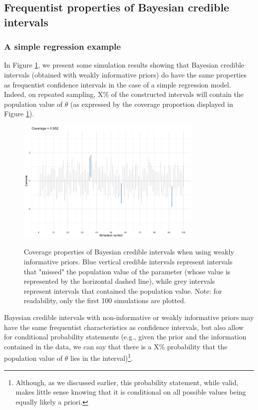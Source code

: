 \documentclass[a4paper,man,natbib,floatsintext,donotrepeattitle]{apa6}
\begin{document}
\subsection{Frequentist properties of Bayesian credible intervals}

\subsubsection{A simple regression example}

In Figure \ref{fig:coverage}, we present some simulation results showing that Bayesian credible intervals (obtained with weakly informative priors) do have the same properties as frequentist confidence intervals in the case of a simple regression model. Indeed, on repeated sampling, X\% of the constructed intervals will contain the population value of $\theta$ (as expressed by the coverage proportion displayed in Figure \ref{fig:coverage}).

\begin{figure}[H]
  \caption{Coverage properties of Bayesian credible intervals when using weakly informative priors. Blue vertical credible intervals represent intervals that "missed" the population value of the parameter (whose value is represented by the horizontal dashed line), while grey intervals represent intervals that contained the population value. Note: for readability, only the first 100 simulations are plotted.}
  \centering
  \includegraphics[width=0.8\textwidth]{coverage1.png}
  \label{fig:coverage}
\end{figure}

Bayesian credible intervals with non-informative or weakly informative priors may have the same frequentist characteristics as confidence intervals, but also allow for conditional probability statements (e.g., given the prior and the information contained in the data, we can say that there is a X\% probability that the population value of $\theta$ lies in the interval)\footnote{Although, as we discussed earlier, this probability statement, while valid, makes little sense knowing that it is conditional on all possible values being equally likely a priori.}.
\end{document}
